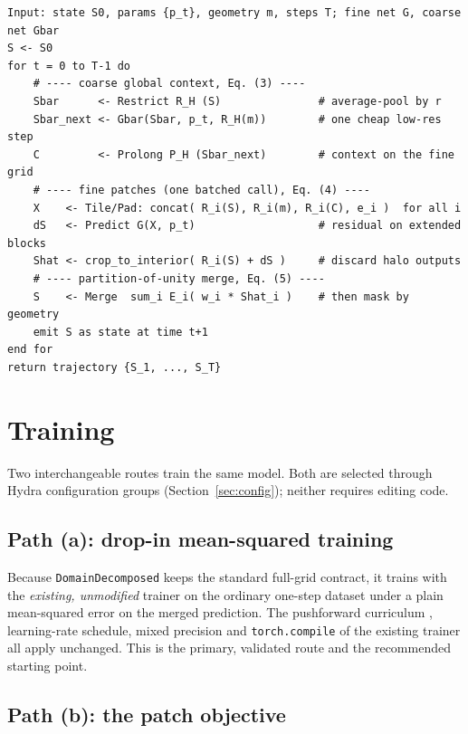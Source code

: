 \documentclass[11pt]{article}
\newcommand{\code}[1]{\texttt{#1}}
\begin{document}
\begin{algorithm}[t]
\caption{Two-level domain-decomposed rollout (one \code{forward} per step)}
\label{alg:rollout}
\begin{lstlisting}[style=pseudo]
Input: state S0, params {p_t}, geometry m, steps T; fine net G, coarse net Gbar
S <- S0
for t = 0 to T-1 do
    # ---- coarse global context, Eq. (3) ----
    Sbar      <- Restrict R_H (S)               # average-pool by r
    Sbar_next <- Gbar(Sbar, p_t, R_H(m))        # one cheap low-res step
    C         <- Prolong P_H (Sbar_next)        # context on the fine grid
    # ---- fine patches (one batched call), Eq. (4) ----
    X    <- Tile/Pad: concat( R_i(S), R_i(m), R_i(C), e_i )  for all i
    dS   <- Predict G(X, p_t)                   # residual on extended blocks
    Shat <- crop_to_interior( R_i(S) + dS )     # discard halo outputs
    # ---- partition-of-unity merge, Eq. (5) ----
    S    <- Merge  sum_i E_i( w_i * Shat_i )    # then mask by geometry
    emit S as state at time t+1
end for
return trajectory {S_1, ..., S_T}
\end{lstlisting}
\end{algorithm}

\section{Training}\label{sec:training}

Two interchangeable routes train the same model. Both are selected through Hydra
configuration groups (Section~\ref{sec:config}); neither requires editing code.

\subsection{Path (a): drop-in mean-squared training}\label{sec:dropin}

Because \code{DomainDecomposed} keeps the standard full-grid contract, it trains
with the \emph{existing, unmodified} trainer on the ordinary one-step dataset under
a plain mean-squared error on the merged prediction. The pushforward curriculum
\cite{brandstetter2022mppde}, learning-rate schedule, mixed precision and
\code{torch.compile} of the existing trainer all apply unchanged. This is the
primary, validated route and the recommended starting point.

\subsection{Path (b): the patch objective}\label{sec:patch}
\end{document}
